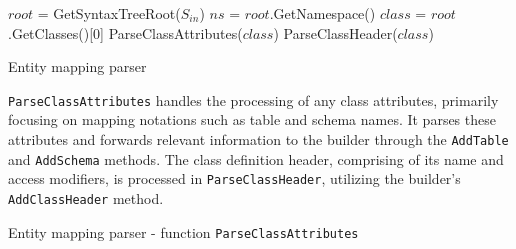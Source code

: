 \begin{algorithm}[!htp]
    \small
    \DontPrintSemicolon
    
    
    $root$ = GetSyntaxTreeRoot($S_{in}$)\;
    \BlankLine
    $ns$ = $root$.GetNamespace()\;
    \BlankLine
    $class$ = $root$.GetClasses()[0]\;
    ParseClassAttributes($class$)\;
    ParseClassHeader($class$)\;
    
    \caption{Entity mapping parser}
    \label{alg:parser_main}
\end{algorithm}


\texttt{ParseClassAttributes} handles the processing of any class attributes, primarily focusing on mapping notations such as table and schema names. It parses these attributes and forwards relevant information to the builder through the \texttt{AddTable} and \texttt{AddSchema} methods. The class definition header, comprising of its name and access modifiers, is processed in \texttt{ParseClassHeader}, utilizing the builder's \texttt{AddClassHeader} method.

\begin{algorithm}[!htp]
    \small
    \DontPrintSemicolon
    
    
    \BlankLine
\caption{Entity mapping parser - function \texttt{ParseClassAttributes}}
\label{alg:parser_class_attr}
\end{algorithm}


